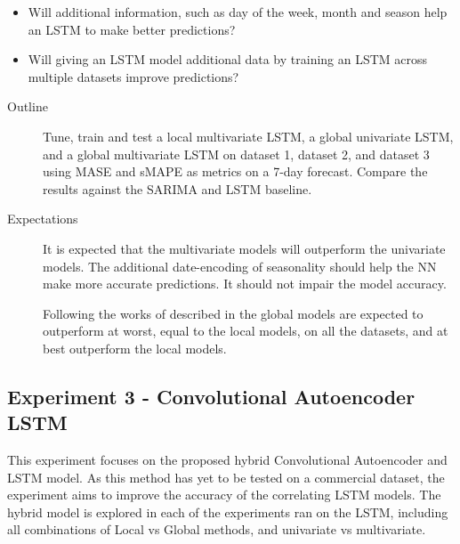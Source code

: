 \begin{itemize}
  \item {Will additional information, such as day of the week, month and season help an LSTM to make better predictions?}
  \item {Will giving an LSTM model additional data by training an LSTM across multiple datasets improve predictions?}
\end{itemize}

\begin{description}
  \item[Outline]{
              Tune, train and test a local multivariate LSTM, a global univariate LSTM,
              and a global multivariate LSTM on dataset 1,
              dataset 2, and dataset 3 using MASE and sMAPE as metrics on a 7-day forecast.
              Compare the results against the SARIMA and LSTM baseline.
        }
\end{description}

\begin{description}
  \item[Expectations]{
              It is expected that the multivariate models will outperform the univariate models.
              The additional date-encoding of seasonality should help the NN make more accurate predictions.
              It should not impair the model accuracy.

              Following the works of \cite{Montero-Manso2021} described in 
              the global models are expected to outperform at worst, equal to the local models, on all the datasets, and at best outperform the local models.

        }
\end{description}

\subsection{Experiment 3 - Convolutional Autoencoder LSTM}
This experiment focuses on the proposed hybrid Convolutional Autoencoder and LSTM model.
As this method has yet to be tested on a commercial dataset,
the experiment aims to improve the accuracy of the correlating LSTM models.
The hybrid model is explored in each of the experiments ran on the LSTM,
including all combinations of Local vs Global methods, and univariate vs multivariate.

